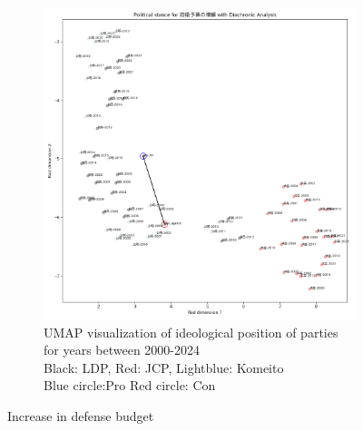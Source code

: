 \documentclass[final,5p,times,twocolumn,authoryear]{elsarticle}
\begin{document}
\begin{figure}[h]
\begin{subfigure}{0.48\textwidth}
		  \includegraphics[width=\textwidth]{figs/results/diachronic_defence/防衛予算の増額_diachronic_umap.png}
		  \caption{UMAP visualization of ideological position of parties for years between 2000-2024 \\\hspace{\textwidth} 
		  Black: LDP, Red: JCP, Lightblue: Komeito\\\hspace{\textwidth}
		  Blue circle:Pro Red circle: Con }
		  \label{fig:sub2}
		\end{subfigure}
	\caption{Increase in defense budget}
	\label{fig: results-diachronic-defense-budget}
\end{figure}
\end{document}
